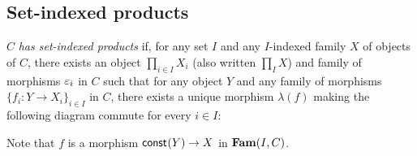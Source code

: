 \subsection{Set-indexed products}
\label{sec:set-indexed-product}

$C$ \emph{has set-indexed products} if, for any set $I$ and any $I$-indexed family $X$ of objects of $C$,
there exists an object $\prod_{i \in I}X_i$ (also written $\prod_{I} X$) and family of morphisms $\varepsilon_i$ in
$C$ such that for any object $Y$ and any family of morphisms $\{f_i: Y \to X_i\}_{i \in I}$ in $C$, there
exists a unique morphism $\lambda(f)$ making the following diagram commute for every $i \in I$:

\begin{center}
\end{center}

Note that $f$ is a morphism $\mathsf{const}_{}(Y) \to X$ in $\mathbf{Fam}(I,C)$.
